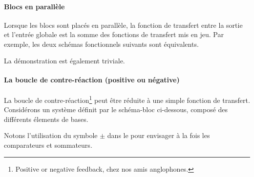 \paragraph{Blocs en parallèle} 

Lorsque les blocs sont placés en parallèle, la fonction de transfert 
entre la sortie et l'entrée globale est la somme des fonctions de transfert mis en jeu.
Par exemple, les deux schémas fonctionnels suivants sont équivalents.

\begin{center}

\end{center}

La démonstration est également triviale.

\paragraph{La boucle de contre-réaction (positive ou négative)}

La boucle de contre-réaction\footnote{\og Positive or negative feedback\fg, chez nos 
amis anglophones.} peut 
être réduite à une simple fonction de transfert.
Considérons un système définit par le schéma-bloc ci-dessous, composé 
des différents élements de bases.

\begin{center}
\end{center}
Notons l'utilisation du symbole $\pm$ dans le pour envisager à la fois les 
comparateurs et sommateurs.

